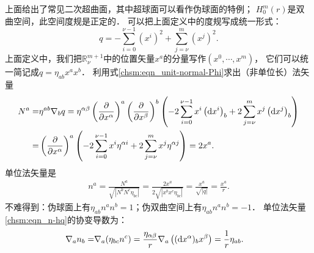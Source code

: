上面给出了常见二次超曲面，其中超球面可以看作伪球面的特例；
$H^m_0(r)$是双曲空间，此空间度规是正定的．
可以把上面定义中的度规写成统一形式：
\begin{equation}\label{chsm:eqn_hqq}
    q=-\sum_{i=0}^{\nu-1} (x^i)^2+\sum_{j=\nu}^{m} (x^j)^2 .
\end{equation}
上面定义中，我们把$\mathbb{R}^{m+1}_\nu$中的位置矢量$x^a$的分量写作$(x^0,\cdots,x^{m})$，
它们可以统一简记成$q=\eta_{ab}x^a x^b$．
利用式\eqref{chsm:eqn_unit-normal-Phi}求出（非单位长）法矢量
\begin{align*}
    N^a=& \eta^{ab} \nabla_bq= \eta^{\alpha\beta} \left(\frac{\partial }{\partial x^\alpha }\right)^a 
    \left(\frac{\partial }{\partial x^\beta }\right)^b 
    \left(-2 \sum_{i=0}^{\nu-1} x^i \left({\rm d}x^i\right)_b
    +2\sum_{j=\nu}^{m} x^j \left({\rm d}x^j\right)_b \right) \\
    =& \left(\frac{\partial }{\partial x^\alpha }\right)^a 
    \left(-2 \sum_{i=0}^{\nu-1} x^i \eta^{\alpha i} 
    +2\sum_{j=\nu}^{m} x^j \eta^{\alpha j} \right)  = 2 x^a .
\end{align*}
单位法矢量是
\begin{align}
    n^a=\frac{ N^a}{\sqrt{|N^b N^c \eta_{bc}|}}=\frac{2 x^a}{2\sqrt{|x^b x^c \eta_{bc}|}}
    =\frac{ x^a}{\sqrt{|q|}}=\frac{ x^a}{r}      . \label{chsm:eqn_n-hq}
\end{align}
不难得到：伪球面上有$\eta_{ab}n^a n^b =1$；伪双曲空间上有$\eta_{ab}n^a n^b =-1$．
单位法矢量\eqref{chsm:eqn_n-hq}的协变导数为：
\begin{align}
    \nabla_a n_b =& \nabla_a (\eta_{bc} n^c) 
     =\frac{ \eta_{\alpha\beta} }{r}\nabla_a \left(({\rm d}x^\alpha)_b x^\beta \right) 
     =\frac{1}{r}\eta_{ab} .  \label{chsm:eqn_Dnhq}
\end{align}


